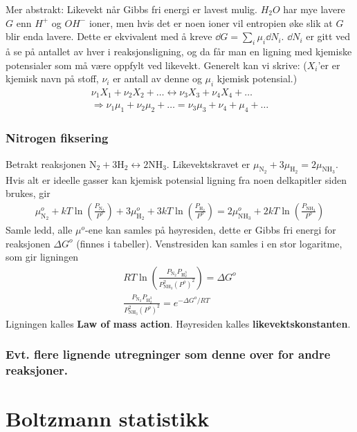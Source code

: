 \documentclass[12pt]{article}
\begin{document}
Mer abstrakt: Likevekt når Gibbs fri energi er lavest mulig. $H_2 O$ har mye lavere
$G$ enn $H^+$ og $OH^-$ ioner, men hvis det er noen ioner vil entropien øke slik at
$G$ blir enda lavere. Dette er ekvivalent med å kreve $\dd G = \sum_i \mu_i \dd N_i$.
$\dd N_i$ er gitt ved å se på antallet av hver i reaksjonsligning, og da får man
en ligning med kjemiske potensialer som må være oppfylt ved likevekt. Generelt kan
vi skrive: ($X_i$'er er kjemisk navn på stoff, $\nu_i$ er antall av denne og $\mu_i$ kjemisk potensial.)
\begin{align*}
  \nu_1 X_1 + \nu_2 X_2 + \hdots \leftrightarrow \nu_3 X_3 + \nu_4 X_4 + \hdots \\
  \Rightarrow \nu_1 \mu_1 + \nu_2 \mu_2 + \hdots = \nu_3 \mu_3 + \nu_4 + \mu_4 + \hdots
\end{align*}
\subsubsection{Nitrogen fiksering}
Betrakt reaksjonen $\text{N}_2 + 3 \text{H}_2 \leftrightarrow 2 \text{NH}_3$.
Likevektskravet er $\mu_{\text{N}_2} + 3 \mu_{\text{H}_2} = 2 \mu_{\text{NH}_3}$. Hvis alt er
ideelle gasser kan kjemisk potensial ligning fra noen delkapitler siden brukes, gir
\begin{align*}
  \mu^o_{\text{N}_2} + kT \ln{\left( \frac{P_{\text{N}_2}}{P^o} \right)} + 3 \mu^o_{\text{H}_2} + 3kT\ln{\left( \frac{P_{\text{H}_2}}{P^o} \right)} = 2 \mu^o_{\text{NH}_3} + 2kT \ln{\left( \frac{P_{\text{NH}_3}}{P^o} \right)}
\end{align*}
Samle ledd, alle $\mu^o$-ene kan samles på høyresiden, dette er Gibbs fri energi for reaksjonen $\Delta G^o$ (finnes i tabeller). Venstresiden
kan samles i en stor logaritme, som gir ligningen
\begin{align*}
  RT \ln{\left( \frac{P_{\text{N}_2} P_{\text{H}_2^3}}{P^2_{\text{NH}_3} (P^o)^2} \right)} = \Delta G^o \\
  \frac{P_{\text{N}_2} P_{\text{H}_2^3}}{P^2_{\text{NH}_3} (P^o)^2} = e^{-\Delta G^o / RT}
\end{align*}
Ligningen kalles \textbf{Law of mass action}. Høyresiden kalles \textbf{likevektskonstanten}.
\subsubsection{Evt. flere lignende utregninger som denne over for andre reaksjoner.}
\section{Boltzmann statistikk}
\end{document}
